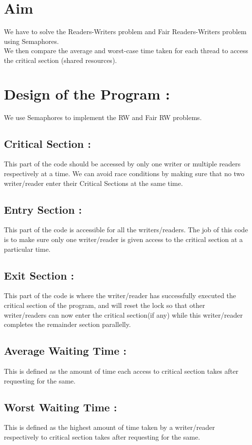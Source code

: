 \documentclass[12pt]{article}
\begin{document}
\maketitle

\section{Aim}
We have to solve the Readers-Writers problem and Fair Readers-Writers problem using Semaphores.\\
We then compare the average and worst-case time taken for each thread to access the critical section (shared
resources).

\section{Design of the Program :}
We use Semaphores to implement the RW and Fair RW problems.
\subsection{Critical Section :}
This part of the code should be accessed by only one writer or multiple readers respectively at a time.
We can avoid race conditions by making sure that no two writer/reader enter their Critical Sections at the same time.
\subsection{Entry Section :}
This part of the code is accessible for all the writers/readers. The job of this code is to make sure only one writer/reader is given access to the critical section at a particular time.
\subsection{Exit Section :}
This part of the code is where the writer/reader has successfully executed the critical section of the program, and will reset the lock so that other writer/readers can now enter the critical section(if any) while this writer/reader completes the remainder section parallelly.
\subsection{Average Waiting Time :}
This is defined as the amount of time each access to critical section takes after requesting for the same.
\subsection{Worst Waiting Time :}
This is defined as the highest amount of time taken by a writer/reader respectively to critical section takes after requesting for the same.
\end{document}
